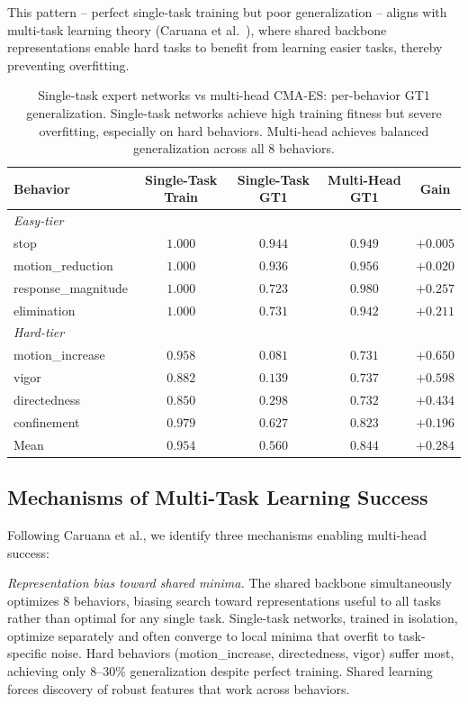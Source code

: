 \documentclass{article}
\begin{document}
This pattern -- perfect single-task training but poor generalization -- aligns with multi-task learning theory (Caruana et al.~\cite{caruana1997multitask}), where shared backbone representations enable hard tasks to benefit from learning easier tasks, thereby preventing overfitting.

\begin{table}[h]
\centering
\caption{Single-task expert networks vs multi-head CMA-ES: per-behavior GT1 generalization. Single-task networks achieve high training fitness but severe overfitting, especially on hard behaviors. Multi-head achieves balanced generalization across all 8 behaviors.}
\label{tab:singletask_vs_multihead}
\small
\begin{tabular}{lcccc}
\toprule
Behavior & Single-Task Train & Single-Task GT1 & Multi-Head GT1 & Gain \\
\midrule
\multicolumn{5}{l}{\textit{Easy-tier}} \\
stop & $1.000$ & $0.944$ & $0.949$ & $+0.005$ \\
motion\_reduction & $1.000$ & $0.936$ & $0.956$ & $+0.020$ \\
response\_magnitude & $1.000$ & $0.723$ & $0.980$ & $+0.257$ \\
elimination & $1.000$ & $0.731$ & $0.942$ & $+0.211$ \\
\midrule
\multicolumn{5}{l}{\textit{Hard-tier}} \\
motion\_increase & $0.958$ & $0.081$ & $0.731$ & $+0.650$ \\
vigor & $0.882$ & $0.139$ & $0.737$ & $+0.598$ \\
directedness & $0.850$ & $0.298$ & $0.732$ & $+0.434$ \\
confinement & $0.979$ & $0.627$ & $0.823$ & $+0.196$ \\
\midrule
Mean & $0.954$ & $0.560$ & $0.844$ & $+0.284$ \\
\bottomrule
\end{tabular}
\end{table}

\subsection{Mechanisms of Multi-Task Learning Success}

Following Caruana et al., we identify three mechanisms enabling multi-head success:

\textit{Representation bias toward shared minima.} The shared backbone simultaneously optimizes 8 behaviors, biasing search toward representations useful to all tasks rather than optimal for any single task. Single-task networks, trained in isolation, optimize separately and often converge to local minima that overfit to task-specific noise. Hard behaviors (motion\_increase, directedness, vigor) suffer most, achieving only 8--30\% generalization despite perfect training. Shared learning forces discovery of robust features that work across behaviors.
\end{document}

